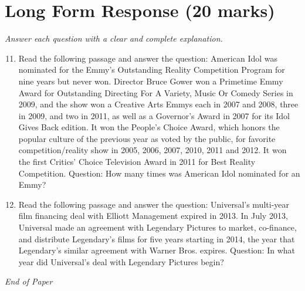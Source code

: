\documentclass[12pt]{article}
\begin{document}
\section*{Long Form Response (20 marks)}
\textit{Answer each question with a clear and complete explanation.}
\begin{enumerate}[label=\arabic*.]
\setcounter{enumi}{10}
\item Read the following passage and answer the question: American Idol was nominated for the Emmy's Outstanding Reality Competition Program for nine years but never won. Director Bruce Gower won a Primetime Emmy Award for Outstanding Directing For A Variety, Music Or Comedy Series in 2009, and the show won a Creative Arts Emmys each in 2007 and 2008, three in 2009, and two in 2011, as well as a Governor's Award in 2007 for its Idol Gives Back edition. It won the People's Choice Award, which honors the popular culture of the previous year as voted by the public, for favorite competition/reality show in 2005, 2006, 2007, 2010, 2011 and 2012. It won the first Critics' Choice Television Award in 2011 for Best Reality Competition. Question: How many times was American Idol nominated for an Emmy?
\item Read the following passage and answer the question: Universal's multi-year film financing deal with Elliott Management expired in 2013. In July 2013, Universal made an agreement with Legendary Pictures to market, co-finance, and distribute Legendary's films for five years starting in 2014, the year that Legendary's similar agreement with Warner Bros. expires. Question: In what year did Universal's deal with Legendary Pictures begin?
\end{enumerate}

\vfill
\noindent\textit{End of Paper}
\end{document}
